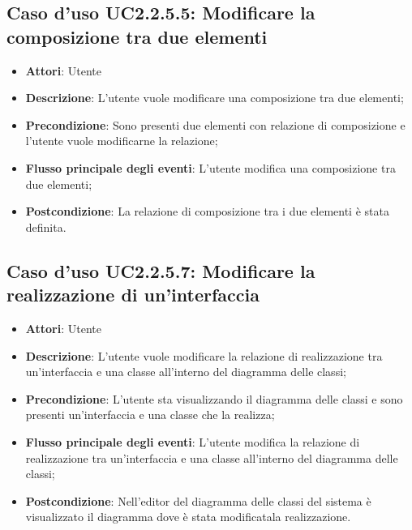 \documentclass[../AnalisiDeiRequisiti.tex]{subfiles}
\begin{document}
			\subsection{Caso d'uso UC2.2.5.5: Modificare la composizione tra due elementi}
			\begin{itemize}
				\item \textbf{Attori}: Utente
				\item \textbf{Descrizione}: L'utente vuole modificare una composizione tra due elementi;
				\item \textbf{Precondizione}: Sono presenti due elementi con relazione di composizione e l'utente vuole modificarne la relazione;
				\item \textbf{Flusso principale degli eventi}: L'utente modifica una composizione tra due elementi;
				\item \textbf{Postcondizione}: La relazione di composizione tra i due elementi è stata definita.	
			\end{itemize}
			\subsection{Caso d'uso UC2.2.5.7: Modificare la realizzazione di un'interfaccia}
			\begin{itemize}
				\item \textbf{Attori}: Utente
				\item \textbf{Descrizione}: L'utente vuole modificare la relazione di realizzazione tra un'interfaccia e una classe all'interno del diagramma delle classi;
				\item \textbf{Precondizione}: L'utente sta visualizzando il diagramma delle classi e sono presenti un'interfaccia e una classe che la realizza;
				\item \textbf{Flusso principale degli eventi}: L'utente modifica la relazione di realizzazione tra un'interfaccia e una classe all'interno del diagramma delle classi;
				\item \textbf{Postcondizione}: Nell'editor del diagramma delle classi del sistema è visualizzato il diagramma dove è stata modificatala realizzazione.
			\end{itemize}
\end{document}
